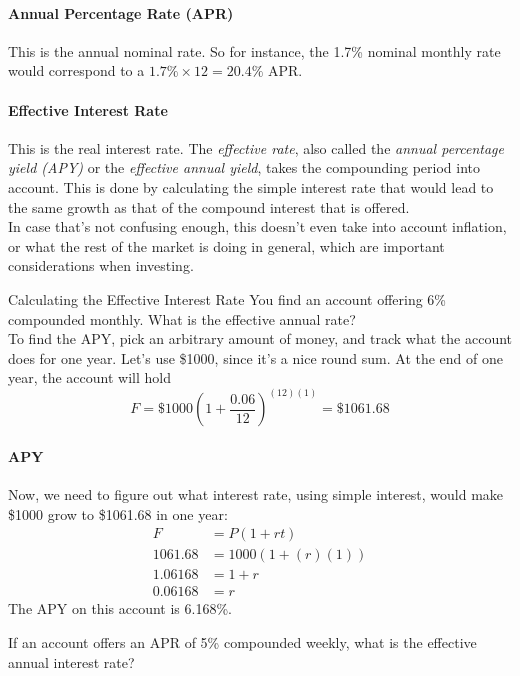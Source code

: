 \paragraph{Annual Percentage Rate (APR)} This is the annual nominal rate.  So for instance, the 1.7\% nominal monthly rate would correspond to a $1.7\% \times 12 = 20.4\%$ APR.

\paragraph{Effective Interest Rate} This is the real interest rate.  The \textit{effective rate}, also called the \textit{annual percentage yield (APY)} or the \textit{effective annual yield}, takes the compounding period into account.  This is done by calculating the simple interest rate that would lead to the same growth as that of the compound interest that is offered.\\

In case that's not confusing enough, this doesn't even take into account inflation, or what the rest of the market is doing in general, which are important considerations when investing.

\begin{example}[https://www.youtube.com/watch?v=mkUrRp9le-8]{Calculating the Effective Interest Rate}
You find an account offering 6\% compounded monthly.  What is the effective annual rate?\\

To find the APY, pick an arbitrary amount of money, and track what the account does for one year.  Let's use \$1000, since it's a nice round sum.  At the end of one year, the account will hold
\[F=\$1000\left(1+\dfrac{0.06}{12}\right)^{(12)(1)} = \$1061.68\]
\paragraph{APY} Now, we need to figure out what interest rate, using simple interest, would make \$1000 grow to \$1061.68 in one year:
\begin{align*}
F &= P(1+rt)\\
1061.68 &= 1000(1+(r)(1))\\
1.06168 &= 1+r\\
0.06168 &= r
\end{align*}
The APY on this account is 6.168\%.
\end{example}

\begin{try}
If an account offers an APR of 5\% compounded weekly, what is the effective annual interest rate?
\end{try}

